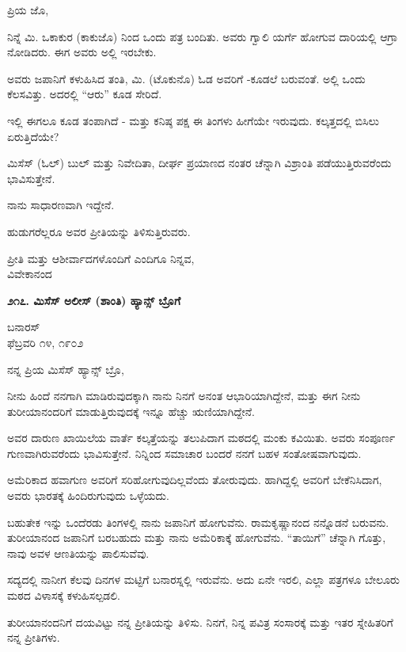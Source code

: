 ಪ್ರಿಯ ಜೊ,

ನಿನ್ನೆ ಮಿ. ಒಕಾಕುರ (ಕಾಕುಜೊ) ನಿಂದ ಒಂದು ಪತ್ರ ಬಂದಿತು. ಅವರು ಗ್ವಾಲಿ ಯರ್ಗೆ ಹೋಗುವ ದಾರಿಯಲ್ಲಿ ಆಗ್ರಾ ನೋಡಿದರು. ಈಗ ಅವರು ಅಲ್ಲಿ ಇರಬೇಕು.

ಅವರು ಜಪಾನಿಗೆ ಕಳುಹಿಸಿದ ತಂತಿ, ಮಿ. (ಟೊಕುನೊ) ಓಡ ಅವರಿಗೆ -ಕೂಡಲೆ ಬರುವಂತೆ. ಅಲ್ಲಿ ಒಂದು ಕೆಲಸವಿತ್ತು. ಅದರಲ್ಲಿ “ಆರು” ಕೂಡ ಸೇರಿದೆ.

ಇಲ್ಲಿ ಈಗಲೂ ಕೂಡ ತಂಪಾಗಿದೆ - ಮತ್ತು ಕನಿಷ್ಠ ಪಕ್ಷ ಈ ತಿಂಗಳು ಹೀಗೆಯೇ ಇರುವುದು. ಕಲ್ಕತ್ತದಲ್ಲಿ ಬಿಸಿಲು ಏರುತ್ತಿದೆಯೇ?

ಮಿಸೆಸ್ (ಓಲ್) ಬುಲ್ ಮತ್ತು ನಿವೇದಿತಾ, ದೀರ್ಘ ಪ್ರಯಾಣದ ನಂತರ ಚೆನ್ನಾಗಿ ವಿಶ್ರಾಂತಿ ಪಡೆಯುತ್ತಿರುವರೆಂದು ಭಾವಿಸುತ್ತೇನೆ.

ನಾನು ಸಾಧಾರಣವಾಗಿ ಇದ್ದೇನೆ.

ಹುಡುಗರೆಲ್ಲರೂ ಅವರ ಪ್ರೀತಿಯನ್ನು ತಿಳಿಸುತ್ತಿರುವರು.

\begin{flushright}
ಪ್ರೀತಿ ಮತ್ತು ಆಶೀರ್ವಾದಗಳೊಂದಿಗೆ ಎಂದಿಗೂ ನಿನ್ನವ,\\ವಿವೇಕಾನಂದ
\end{flushright}

\begin{center}
\textbf{೨೧೭. ಮಿಸೆಸ್ ಅಲೀಸ್ (ಶಾಂತಿ) ಹ್ಯಾನ್ಸ್ ಬ್ರೊಗೆ}
\end{center}

\begin{flushright}
ಬನಾರಸ್\\ಫೆಬ್ರವರಿ ೧೪, ೧೯೦೨
\end{flushright}

ನನ್ನ ಪ್ರಿಯ ಮಿಸೆಸ್ ಹ್ಯಾನ್ಸ್ ಬ್ರೊ,

ನೀನು ಹಿಂದೆ ನನಗಾಗಿ ಮಾಡಿರುವುದಕ್ಕಾಗಿ ನಾನು ನಿನಗೆ ಅನಂತ ಆಭಾರಿಯಾಗಿದ್ದೇನೆ, ಮತ್ತು ಈಗ ನೀನು ತುರೀಯಾನಂದರಿಗೆ ಮಾಡುತ್ತಿರುವುದಕ್ಕೆ ಇನ್ನೂ ಹೆಚ್ಚು ಋಣಿಯಾಗಿದ್ದೇನೆ.

ಅವರ ದಾರುಣ ಖಾಯಿಲೆಯ ವಾರ್ತೆ ಕಲ್ಕತ್ತೆಯನ್ನು ತಲುಪಿದಾಗ ಮಠದಲ್ಲಿ ಮಂಕು ಕವಿಯಿತು. ಅವರು ಸಂಪೂರ್ಣ ಗುಣವಾಗಿರುವರೆಂದು ಭಾವಿಸುತ್ತೇನೆ. ನಿನ್ನಿಂದ ಸಮಾಚಾರ ಬಂದರೆ ನನಗೆ ಬಹಳ ಸಂತೋಷವಾಗುವುದು.

ಅಮೆರಿಕಾದ ಹವಾಗುಣ ಅವರಿಗೆ ಸರಿಹೋಗುವುದಿಲ್ಲವೆಂದು ತೋರುವುದು. ಹಾಗಿದ್ದಲ್ಲಿ ಅವರಿಗೆ ಬೇಕೆನಿಸಿದಾಗ, ಅವರು ಭಾರತಕ್ಕೆ ಹಿಂದಿರುಗುವುದು ಒಳ್ಳೆಯದು.

ಬಹುತೇಕ ಇನ್ನು ಒಂದೆರಡು ತಿಂಗಳಲ್ಲಿ ನಾನು ಜಪಾನಿಗೆ ಹೋಗುವೆನು. ರಾಮಕೃಷ್ಣಾನಂದ ನನ್ನೊಡನೆ ಬರುವನು. ತುರೀಯಾನಂದ ಜಪಾನಿಗೆ ಬರಬಹುದು ಮತ್ತು ನಾನು ಅಮೆರಿಕಾಕ್ಕೆ ಹೋಗುವೆನು. “ತಾಯಿಗೆ” ಚೆನ್ನಾಗಿ ಗೊತ್ತು, ನಾವು ಅವಳ ಆಣತಿಯನ್ನು ಪಾಲಿಸುವೆವು.

ಸದ್ಯದಲ್ಲಿ ನಾನೀಗ ಕೆಲವು ದಿನಗಳ ಮಟ್ಟಿಗೆ ಬನಾರಸ್ನಲ್ಲಿ ಇರುವೆನು. ಅದು ಏನೇ ಇರಲಿ, ಎಲ್ಲಾ ಪತ್ರಗಳೂ ಬೇಲೂರು ಮಠದ ವಿಳಾಸಕ್ಕೆ ಕಳುಹಿಸಲ್ಪಡಲಿ.

ತುರೀಯಾನಂದನಿಗೆ ದಯವಿಟ್ಟು ನನ್ನ ಪ್ರೀತಿಯನ್ನು ತಿಳಿಸು. ನಿನಗೆ, ನಿನ್ನ ಪವಿತ್ರ ಸಂಸಾರಕ್ಕೆ ಮತ್ತು ಇತರ ಸ್ನೇಹಿತರಿಗೆ ನನ್ನ ಪ್ರೀತಿಗಳು.


